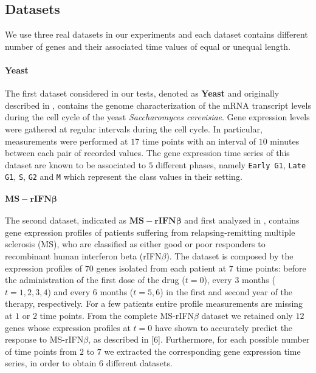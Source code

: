 \subsection{Datasets}
We use three real datasets in our experiments and each dataset contains different number of genes and their associated time values of equal or unequal length.

\paragraph*{Yeast} The first dataset considered in our tests, denoted as \textbf{Yeast} and originally described in \cite{first_dataset}, contains the genome characterization of the mRNA transcript levels during the cell cycle of the yeast \textit{Saccharomyces cerevisiae}. Gene expression levels were gathered at regular intervals during the cell cycle. In particular, measurements were performed at $17$ time points with an interval of $10$ minutes between each pair of recorded values. The gene expression time series of this dataset are known to be associated to $5$ different phases, namely \texttt{Early G1}, \texttt{Late G1}, \texttt{S}, \texttt{G2} and \texttt{M} which represent the class values in their setting.
\paragraph*{$\mathbf{MS-rIFN\beta}$}
The second dataset, indicated as $\mathbf{MS-rIFN\beta}$ and first analyzed in \cite{second_dataset}, contains gene expression profiles of patients suffering from relapsing-remitting multiple sclerosis (MS), who are classified as either good or poor responders to recombinant human interferon beta (rIFN$\beta$). The dataset is composed by the expression profiles of $70$ genes isolated from each patient at $7$ time points: before the administration of the first dose of the drug ($t= 0$), every $3$ months ($t=1, 2, 3, 4$) and every $6$ months ($t=5,6$) in the first and second year of the therapy, respectively. For a few patients entire profile measurements are missing at $1$ or $2$ time points. From the complete MS-rIFN$\beta$ dataset we retained only $12$ genes whose expression profiles at $t = 0$ have shown to accurately predict the response to MS-rIFN$\beta$, as described in [6]. Furthermore, for each possible number of time points from $2$ to $7$ we extracted the corresponding gene expression time series, in order to obtain $6$ different datasets.